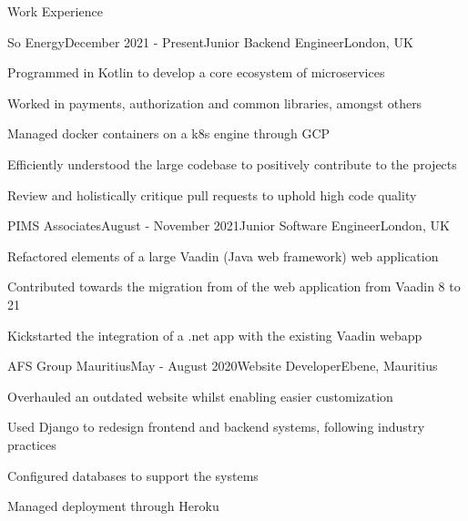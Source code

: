 \documentclass{resume} %
\begin{document}
\begin{rSection}{Work Experience}
  \begin{rSubsection}{So Energy}{December 2021 - Present}{Junior Backend Engineer}{London, UK}
    \item Programmed in Kotlin to develop a core ecosystem of microservices
    \item Worked in payments, authorization and common libraries, amongst others
    \item Managed docker containers on a k8s engine through GCP
    \item Efficiently understood the large codebase to positively contribute to the projects
    \item Review and holistically critique pull requests to uphold high code quality
  \end{rSubsection}
    
  \begin{rSubsection}{PIMS Associates}{August - November 2021}{Junior Software Engineer}{London, UK}
    \item Refactored elements of a large Vaadin (Java web framework) web application
    \item Contributed towards the migration from of the web application from  Vaadin 8 to 21
    \item Kickstarted the integration of a .net app with the existing Vaadin webapp
  \end{rSubsection}
  
  \begin{rSubsection}{AFS Group Mauritius}{May - August 2020}{Website Developer}{Ebene, Mauritius}
    \item Overhauled an outdated website whilst enabling easier customization
    \item Used Django to redesign frontend and backend systems, following industry practices
    \item Configured databases to support the systems
    \item Managed deployment through Heroku
  \end{rSubsection}

  

\end{rSection}
\end{document}
